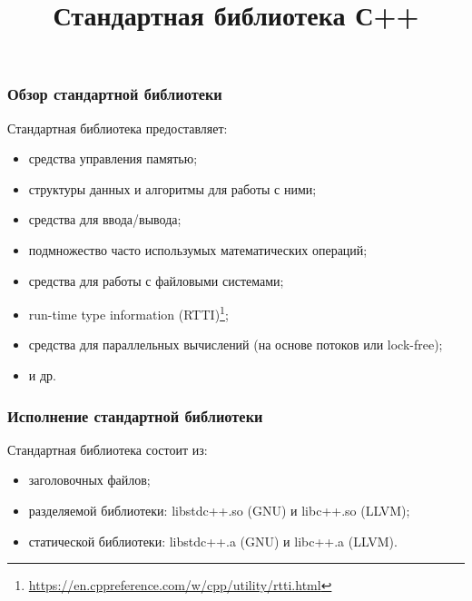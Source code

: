 \documentclass[compress, 8pt]{beamer}
\title{Стандартная библиотека С++}
\begin{document}
  \frame[plain]{\titlepage}

  \begin{frame}[fragile]

    \frametitle{Обзор стандартной библиотеки}

    Стандартная библиотека предоставляет:
    \hfill \break

    \begin{itemize}

      \item средства управления памятью;
      \item структуры данных и алгоритмы для работы с ними;
      \item средства для ввода/вывода;
      \item подмножество часто использумых математических операций;
      \item средства для работы с файловыми системами;
      \item run-time type information (RTTI)\footnote{\url{https://en.cppreference.com/w/cpp/utility/rtti.html}};
      \item средства для параллельных вычислений (на основе потоков или lock-free);
      \item и др.

    \end{itemize}

  \end{frame}

  \begin{frame}[fragile]

    \frametitle{Исполнение стандартной библиотеки}

    Стандартная библиотека состоит из:
    \hfill \break

    \begin{itemize}

      \item заголовочных файлов;
      \item разделяемой библиотеки: libstdc++.so (GNU) и libc++.so (LLVM);
      \item статической библиотеки: libstdc++.a (GNU) и libc++.a (LLVM).

    \end{itemize}

  \end{frame}
\end{document}

